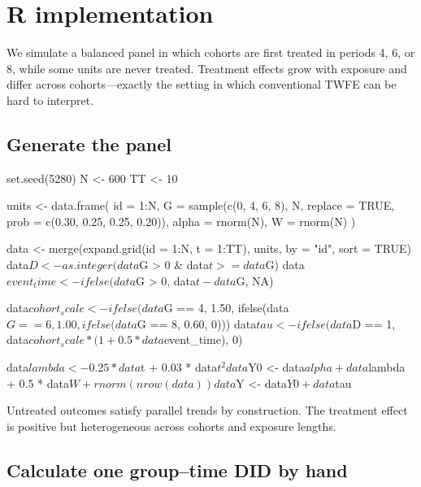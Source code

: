 \section{R implementation}
\label{sec:did-r}

We simulate a balanced panel in which cohorts are first treated in periods 4,
6, or 8, while some units are never treated.  Treatment effects grow with
exposure and differ across cohorts---exactly the setting in which conventional
TWFE can be hard to interpret.

\subsection{Generate the panel}

\begin{rcode}
set.seed(5280)
N <- 600
TT <- 10

units <- data.frame(
  id = 1:N,
  G = sample(c(0, 4, 6, 8), N, replace = TRUE,
             prob = c(0.30, 0.25, 0.25, 0.20)),
  alpha = rnorm(N),
  W = rnorm(N)
)

data <- merge(expand.grid(id = 1:N, t = 1:TT), units,
              by = "id", sort = TRUE)
data$D <- as.integer(data$G > 0 & data$t >= data$G)
data$event_time <- ifelse(data$G > 0, data$t - data$G, NA)

data$cohort_scale <- ifelse(data$G == 4, 1.50,
                     ifelse(data$G == 6, 1.00,
                     ifelse(data$G == 8, 0.60, 0)))
data$tau <- ifelse(data$D == 1,
                   data$cohort_scale * (1 + 0.5 * data$event_time), 0)

data$lambda <- 0.25 * data$t + 0.03 * data$t^2
data$Y0 <- data$alpha + data$lambda + 0.5 * data$W +
           rnorm(nrow(data))
data$Y <- data$Y0 + data$tau
\end{rcode}

Untreated outcomes satisfy parallel trends by construction.  The treatment
effect is positive but heterogeneous across cohorts and exposure lengths.

\subsection{Calculate one group--time DID by hand}


